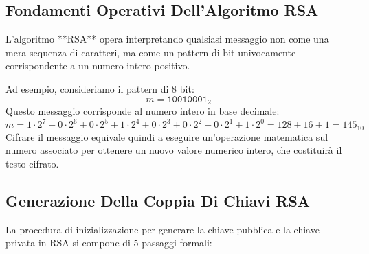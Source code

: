 \documentclass[11pt, a4paper]{article}
\begin{document}
\subsection{Fondamenti Operativi Dell'Algoritmo RSA}

L'algoritmo **RSA** opera interpretando qualsiasi messaggio non come una mera sequenza di caratteri, ma come un pattern di bit univocamente corrispondente a un numero intero positivo.

Ad esempio, consideriamo il pattern di 8 bit:
\[
m = \texttt{10010001}_2
\]
Questo messaggio corrisponde al numero intero in base decimale:
\[
m = 1 \cdot 2^7 + 0 \cdot 2^6 + 0 \cdot 2^5 + 1 \cdot 2^4 + 0 \cdot 2^3 + 0 \cdot 2^2 + 0 \cdot 2^1 + 1 \cdot 2^0 = 128 + 16 + 1 = 145_{10}
\]
Cifrare il messaggio equivale quindi a eseguire un'operazione matematica sul numero associato per ottenere un nuovo valore numerico intero, che costituirà il testo cifrato.

\subsection{Generazione Della Coppia Di Chiavi RSA}

La procedura di inizializzazione per generare la chiave pubblica e la chiave privata in RSA si compone di 5 passaggi formali:
\end{document}
